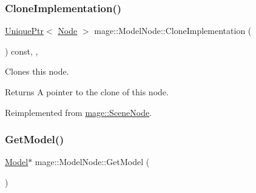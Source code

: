 \hypertarget{classmage_1_1_model_node_a34146201083015276b38240af307417f}{}\label{classmage_1_1_model_node_a34146201083015276b38240af307417f} 
\subsubsection{\texorpdfstring{Clone\+Implementation()}{CloneImplementation()}}
{\footnotesize\ttfamily \hyperlink{namespacemage_a8c307fbcc33bce9b7f2aa4c26c3b95cf}{Unique\+Ptr}$<$ \hyperlink{classmage_1_1_node}{Node} $>$ mage\+::\+Model\+Node\+::\+Clone\+Implementation (\begin{DoxyParamCaption}{ }\end{DoxyParamCaption}) const\hspace{0.3cm}{\ttfamily [override]}, {\ttfamily [private]}, {\ttfamily [virtual]}}

Clones this node.

\begin{DoxyReturn}{Returns}
A pointer to the clone of this node. 
\end{DoxyReturn}


Reimplemented from \hyperlink{classmage_1_1_scene_node_a42d0d53ab804d38ebd584d2de6490eeb}{mage\+::\+Scene\+Node}.

\hypertarget{classmage_1_1_model_node_a358f3458d4444ea026467505eac0b675}{}\label{classmage_1_1_model_node_a358f3458d4444ea026467505eac0b675} 
\subsubsection{\texorpdfstring{Get\+Model()}{GetModel()}\hspace{0.1cm}{\footnotesize\ttfamily [1/2]}}
{\footnotesize\ttfamily \hyperlink{classmage_1_1_model}{Model}$\ast$ mage\+::\+Model\+Node\+::\+Get\+Model (\begin{DoxyParamCaption}{ }\end{DoxyParamCaption})}

\hypertarget{classmage_1_1_model_node_a721b88e6649758b2258c95e972478249}{}\label{classmage_1_1_model_node_a721b88e6649758b2258c95e972478249} 
